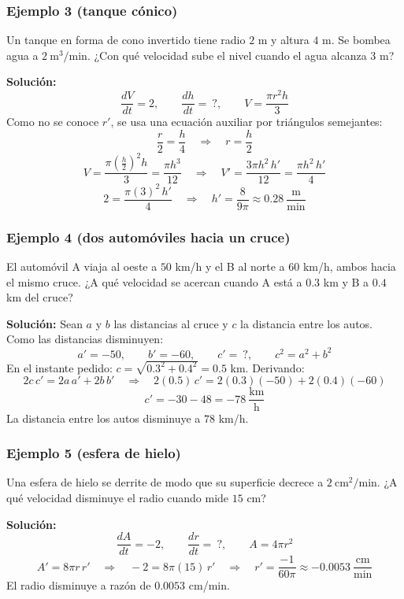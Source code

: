 \documentclass[12pt]{article}
\begin{document}
\subsubsection{Ejemplo 3 (tanque cónico)}


Un tanque en forma de cono invertido tiene radio $2$ m y altura $4$ m. Se bombea agua a $2\ \text{m}^3/\text{min}$. ¿Con qué velocidad sube el nivel cuando el agua alcanza $3$ m?

\textbf{Solución:}
\[
\frac{dV}{dt} = 2, \qquad \frac{dh}{dt} = \ ?, \qquad V = \frac{\pi r^2 h}{3}
\]
Como no se conoce $r'$, se usa una ecuación auxiliar por triángulos semejantes:
\[
\frac{r}{2} = \frac{h}{4} \quad \Rightarrow \quad r = \frac{h}{2}
\]
\[
V = \frac{\pi \left(\frac{h}{2}\right)^2 h}{3} = \frac{\pi h^3}{12} \quad \Rightarrow \quad V' = \frac{3\pi h^2 \, h'}{12} = \frac{\pi h^2 \, h'}{4}
\]
\[
2 = \frac{\pi (3)^2 \, h'}{4} \quad \Rightarrow \quad h' = \frac{8}{9\pi} \approx 0.28\ \frac{\text{m}}{\text{min}}
\]



\subsubsection{Ejemplo 4 (dos automóviles hacia un cruce)}


El automóvil A viaja al oeste a $50$ km/h y el B al norte a $60$ km/h, ambos hacia el mismo cruce. ¿A qué velocidad se acercan cuando A está a $0.3$ km y B a $0.4$ km del cruce?

\textbf{Solución:} Sean $a$ y $b$ las distancias al cruce y $c$ la distancia entre los autos. Como las distancias disminuyen:
\[
a' = -50, \qquad b' = -60, \qquad c' = \ ?, \qquad c^2 = a^2 + b^2
\]
En el instante pedido: $c = \sqrt{0.3^2 + 0.4^2} = 0.5$ km. Derivando:
\[
2c\,c' = 2a\,a' + 2b\,b' \quad \Rightarrow \quad 2(0.5)\,c' = 2(0.3)(-50) + 2(0.4)(-60)
\]
\[
c' = -30 - 48 = -78\ \frac{\text{km}}{\text{h}}
\]
La distancia entre los autos disminuye a $78$ km/h.



\subsubsection{Ejemplo 5 (esfera de hielo)}


Una esfera de hielo se derrite de modo que su superficie decrece a $2\ \text{cm}^2/\text{min}$. ¿A qué velocidad disminuye el radio cuando mide $15$ cm?

\textbf{Solución:}
\[
\frac{dA}{dt} = -2, \qquad \frac{dr}{dt} = \ ?, \qquad A = 4\pi r^2
\]
\[
A' = 8\pi r \, r' \quad \Rightarrow \quad -2 = 8\pi (15)\, r' \quad \Rightarrow \quad r' = \frac{-1}{60\pi} \approx -0.0053\ \frac{\text{cm}}{\text{min}}
\]
El radio disminuye a razón de $0.0053$ cm/min.
\end{document}
